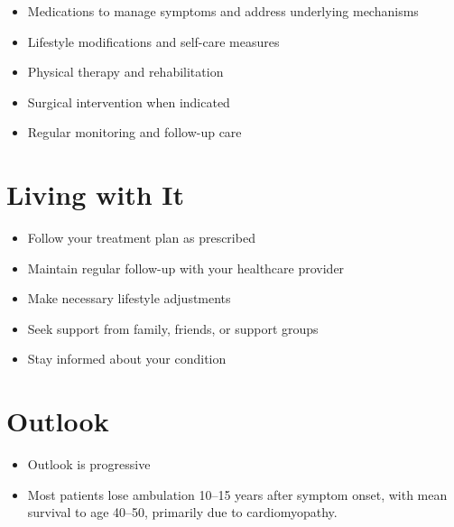 \begin{itemize}[noitemsep]
  \item Medications to manage symptoms and address underlying mechanisms
  \item Lifestyle modifications and self-care measures
  \item Physical therapy and rehabilitation
  \item Surgical intervention when indicated
  \item Regular monitoring and follow-up care
\end{itemize}
\section{Living with It}
\begin{itemize}[noitemsep]
  \item Follow your treatment plan as prescribed
  \item Maintain regular follow-up with your healthcare provider
  \item Make necessary lifestyle adjustments
  \item Seek support from family, friends, or support groups
  \item Stay informed about your condition
\end{itemize}
\section{Outlook}
\begin{itemize}[noitemsep]
  \item Outlook is progressive
  \item Most patients lose ambulation 10--15 years after symptom onset, with mean survival to age 40--50, primarily due to cardiomyopathy.
\end{itemize}

